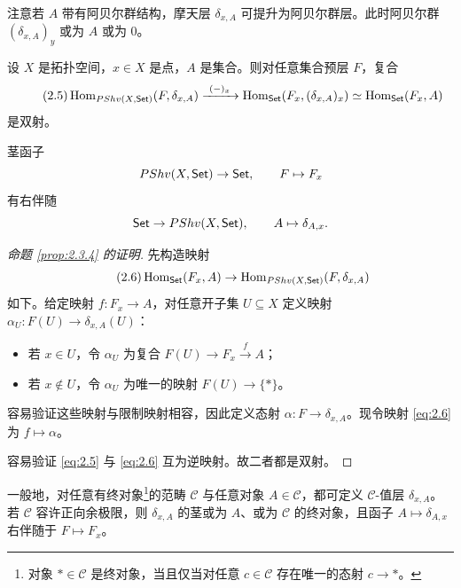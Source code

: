 注意若 $A$ 带有阿贝尔群结构，摩天层 $\delta_{x,A}$ 可提升为阿贝尔群层。此时阿贝尔群 $(\delta_{x,A})_y$ 或为 $A$ 或为 $0$。

\begin{proposition}\label{prop:2.3.4}
设 $X$ 是拓扑空间，$x\in X$ 是点，$A$ 是集合。则对任意集合预层 $F$，复合
\begin{equation}\tag{2.5}\label{eq:2.5}
\Hom_{\PShv(X,\Set)}(F,\delta_{x,A})\xrightarrow{\ (-)_x\ }\Hom_{\Set}(F_x,(\delta_{x,A})_x)\simeq\Hom_{\Set}(F_x,A)
\end{equation}
是双射。
\end{proposition}

\begin{corollary}\label{cor:2.3.5}
茎函子
\[
PShv(X,\mathsf{Set})\to\mathsf{Set},\qquad F\mapsto F_x
\]
有右伴随
\[
\mathsf{Set}\to PShv(X,\mathsf{Set}),\qquad A\mapsto\delta_{A,x}.
\]
\end{corollary}

\begin{proof}[命题 \ref{prop:2.3.4} 的证明]
先构造映射
\begin{equation}\tag{2.6}\label{eq:2.6}
\operatorname{Hom}_{\mathsf{Set}}(F_x,A)\to\operatorname{Hom}_{PShv(X,\mathsf{Set})}(F,\delta_{x,A})
\end{equation}
如下。给定映射 $f\colon F_x\to A$，对任意开子集 $U\subseteq X$ 定义映射 $\alpha_U\colon F(U)\to\delta_{x,A}(U)$：
\begin{itemize}
  \item 若 $x\in U$，令 $\alpha_U$ 为复合 $F(U)\to F_x\xrightarrow{\ f\ }A$；
  \item 若 $x\notin U$，令 $\alpha_U$ 为唯一的映射 $F(U)\to\{*\}$。
\end{itemize}
容易验证这些映射与限制映射相容，因此定义态射 $\alpha\colon F\to\delta_{x,A}$。现令映射 \eqref{eq:2.6} 为 $f\mapsto\alpha$。

容易验证 \eqref{eq:2.5} 与 \eqref{eq:2.6} 互为逆映射。故二者都是双射。
\end{proof}

\begin{remark}\label{rem:2.3.6}
一般地，对任意有终对象\footnote{对象 $*\in\mathcal C$ 是终对象，当且仅当对任意 $c\in\mathcal C$ 存在唯一的态射 $c\to *$。}的范畴 $\mathcal C$ 与任意对象 $A\in\mathcal C$，都可定义 $\mathcal C$-值层 $\delta_{x,A}$。若 $\mathcal C$ 容许正向余极限，则 $\delta_{x,A}$ 的茎或为 $A$、或为 $\mathcal C$ 的终对象，且函子 $A\mapsto\delta_{A,x}$ 右伴随于 $F\mapsto F_x$。
\end{remark}
